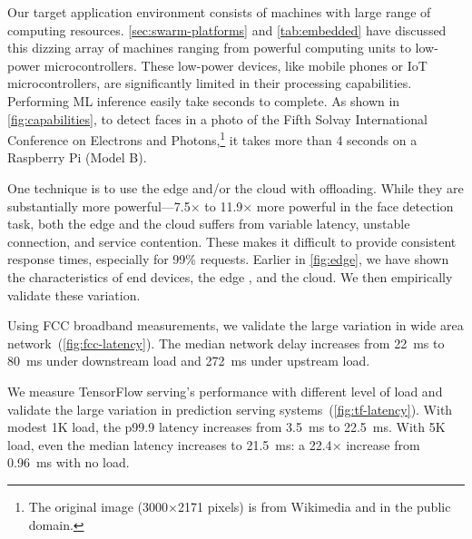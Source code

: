 Our target application environment consists of machines with large range of
computing resources. \autoref{sec:swarm-platforms} and \autoref{tab:embedded}
have discussed this dizzing array of machines ranging from powerful computing
units to low-power microcontrollers.  These low-power devices, like mobile
phones or IoT microcontrollers, are significantly limited in their processing
capabilities. Performing ML inference easily take seconds to complete. As shown
in \autoref{fig:capabilities}, to detect faces in a photo of the Fifth Solvay
International Conference on Electrons and Photons,\footnote{The original image
  (3000$\times$2171 pixels) is from Wikimedia and in the public domain.} it
takes more than 4 seconds on a Raspberry Pi (Model B).

One technique is to use the edge and/or the cloud with offloading. While they
are substantially more powerful---7.5$\times$ to 11.9$\times$ more powerful in
the face detection task, both the edge and the cloud suffers from variable
latency, unstable connection, and service contention. These makes it difficult
to provide consistent response times, especially for 99\% requests. Earlier in
\autoref{fig:edge}, we have shown the characteristics of end devices, the edge ,
and the cloud. We then empirically validate these variation.

 Using FCC broadband measurements, we validate the
large variation in wide area network~(\autoref{fig:fcc-latency}). The median
network delay increases from \SI{22}{\ms} to \SI{80}{\ms} under downstream load
and \SI{272}{\ms} under upstream load.

 \noindent We measure TensorFlow serving's performance
with different level of load and validate the large variation in prediction
serving systems~(\autoref{fig:tf-latency}). With modest 1K load, the p99.9
latency increases from \SI{3.5}{\ms} to \SI{22.5}{\ms}. With 5K load, even the
median latency increases to \SI{21.5}{\ms}: a 22.4$\times$ increase from
\SI{0.96}{\ms} with no load.


